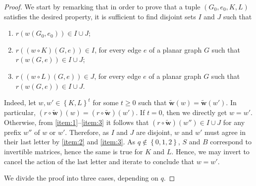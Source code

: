 \documentclass[A4paper,reqno,oneside,12pt]{amsart}
\theoremstyle{plain}
\theoremstyle{definition}
\newcommand{\set}[1]{\left\{ #1 \right\}}
\begin{document}
\begin{proof}


We start by remarking that in order to prove that a tuple $(G_0,e_0,K,L)$ satisfies the desired property, it is sufficient to find disjoint sets $I$ and $J$ such that \begin{enumerate}
    \item \label{item:1}$r(w(G_0,e_0)) \in I \cup J$;    \item\label{item:2}$r((w\circ K)(G,e))\in I$, for every edge $e$ of a planar graph $G$ such that $r(w(G,e)) \in I \cup J$;
    \item \label{item:3}$r((w\circ L)(G,e))\in J$, for every edge $e$ of a planar graph $G$ such that $r(w(G,e)) \in I \cup J$.
\end{enumerate}
Indeed, let $w, w' \in \set{K,L}^t$ for some $t \geq 0$ such that $\widetilde{\mathbf{w}}(w)= \widetilde{\mathbf{w}}(w')$. In particular, $(r \circ \widetilde{\mathbf{w}}) (w) = (r \circ \widetilde{\mathbf{w}})(w')$. If $ t= 0$, then we directly get $w = w'$. Otherwise, from \eqref{item:1}--\eqref{item:3} it follows that $(r\circ \widetilde{\mathbf{w}})(w'') \in I \cup J$ for any prefix $w''$ of $w$ or $w'$. Therefore, as $I$ and $J$ are disjoint, $w$ and $w'$ must agree in their last letter by \eqref{item:2} and \eqref{item:3}. As $q \not \in \set{0,1,2}$, $S$ and $B$ correspond to invertible matrices, hence the same is true for $K$ and $L$. Hence, we may invert to cancel the action of the last letter and iterate to conclude that $w = w'$.

We divide the proof into three cases, depending on $q$.


\end{proof}
\end{document}
